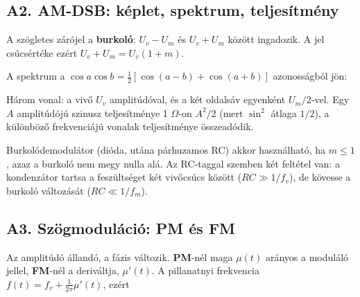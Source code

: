 \subsection{\texorpdfstring{A2. AM-DSB: képlet, spektrum, teljesítmény}{A2. AM-DSB: képlet, spektrum, teljesítmény}}\label{b1-am}
\begin{center}\end{center}

A szögletes zárójel a \textbf{burkoló}: $U_v-U_m$ és $U_v+U_m$ között ingadozik. A jel csúcsértéke ezért $U_v+U_m=U_v(1+m)$.

A spektrum a $\cos a\cos b=\tfrac12\left[\cos(a-b)+\cos(a+b)\right]$ azonosságból jön:

\begin{center}\end{center}

Három vonal: a vivő $U_v$ amplitúdóval, és a két oldalsáv egyenként $U_m/2$-vel. Egy $A$ amplitúdójú szinusz teljesítménye 1 $\Omega$-on $A^2/2$ (mert $\sin^2$ átlaga $1/2$), a különböző frekvenciájú vonalak teljesítménye összeadódik.

Burkolódemodulátor (dióda, utána párhuzamos RC) akkor használható, ha $m\le1$, azaz a burkoló nem megy nulla alá. Az RC-taggal szemben két feltétel van: a kondenzátor tartsa a feszültséget két vivőcsúcs között ($RC\gg1/f_v$), de kövesse a burkoló változását ($RC\ll1/f_m$).

\subsection{\texorpdfstring{A3. Szögmoduláció: PM és FM}{A3. Szögmoduláció: PM és FM}}\label{b1-fm}
\begin{center}\end{center}

Az amplitúdó állandó, a fázis változik. \textbf{PM}-nél maga $\mu(t)$ arányos a moduláló jellel, \textbf{FM}-nél a deriváltja, $\mu'(t)$. A pillanatnyi frekvencia $f(t)=f_v+\tfrac1{2\pi}\mu'(t)$, ezért

\begin{center}\end{center}

